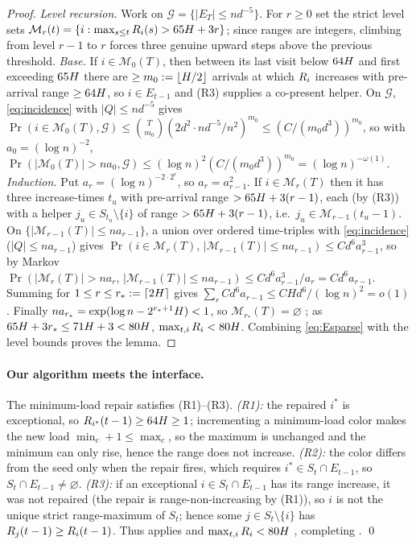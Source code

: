 \begin{proof}
\emph{Level recursion.} Work on $\mathcal G=\{|E_T|\le nd^{-5}\}$. For $r\ge0$ set the strict level sets
$\mathcal M_r(t)=\{i:\max_{s\le t}R_i(s)>65H+3r\}$; since ranges are integers, climbing from level $r-1$ to $r$
forces three genuine upward steps above the previous threshold. \emph{Base.} If $i\in\mathcal M_0(T)$, then between its last
visit below $64H$ and first exceeding $65H$ there are $\ge m_0:=\lfloor H/2\rfloor$ arrivals at which
$R_i$ increases with pre-arrival range $\ge 64H$, so $i\in E_{t-1}$ and (R3) supplies a co-present helper. On
$\mathcal G$, \eqref{eq:incidence} with $|Q|\le nd^{-5}$ gives $\Pr(i\in\mathcal M_0(T),\mathcal G)\le\binom{T}{m_0}(2d^2\cdot nd^{-5}/n^2)^{m_0}\le(C/(m_0 d^3))^{m_0}$,
so with $a_0=(\log n)^{-2}$, $\Pr(|\mathcal M_0(T)|>na_0,\mathcal G)\le(\log n)^2(C/(m_0d^3))^{m_0}=(\log n)^{-\omega(1)}$.
\emph{Induction.} Put $a_r=(\log n)^{-2\cdot2^r}$, so $a_r=a_{r-1}^2$. If $i\in\mathcal M_r(T)$ then it has three increase-times
$t_u$ with pre-arrival range $>65H+3(r-1)$, each (by (R3)) with a helper $j_u\in S_{t_u}\setminus\{i\}$ of range
$>65H+3(r-1)$, i.e.\ $j_u\in\mathcal M_{r-1}(t_u-1)$. On $\{|\mathcal M_{r-1}(T)|\le na_{r-1}\}$, a union over ordered
time-triples with \eqref{eq:incidence} ($|Q|\le na_{r-1}$) gives $\Pr(i\in\mathcal M_r(T),\,|\mathcal M_{r-1}(T)|\le na_{r-1})\le C d^6 a_{r-1}^3$,
so by Markov $\Pr(|\mathcal M_r(T)|>na_r,\,|\mathcal M_{r-1}(T)|\le na_{r-1})\le Cd^6 a_{r-1}^3/a_r=Cd^6 a_{r-1}$. Summing for
$1\le r\le r_*:=\lceil 2H\rceil$ gives $\sum_r Cd^6 a_{r-1}\le CHd^6/(\log n)^2=o(1)$. Finally
$na_{r_*}=\exp(\log n-2^{r_*+1}H)<1$, so $\mathcal M_{r_*}(T)=\varnothing$ \whp; as $65H+3r_*\le 71H+3<80H$,
$\max_{t,i}R_i<80H$. Combining \eqref{eq:Esparse} with the level bounds proves the lemma.
\end{proof}

\paragraph{Our algorithm meets the interface.}
The minimum-load repair satisfies (R1)--(R3). \emph{(R1):} the repaired $i^*$ is exceptional, so $R_{i^*}(t-1)\ge 64H\ge1$;
incrementing a minimum-load color makes the new load $\min_c+1\le\max_c$, so the maximum is unchanged and the minimum can only
rise, hence the range does not increase. \emph{(R2):} the color differs from the seed only when the repair fires, which
requires $i^*\in S_t\cap E_{t-1}$, so $S_t\cap E_{t-1}\ne\varnothing$. \emph{(R3):} if an exceptional $i\in S_t\cap E_{t-1}$
has its range increase, it was not repaired (the repair is range-non-increasing by (R1)), so $i$ is not the unique strict
range-maximum of $S_t$; hence some $j\in S_t\setminus\{i\}$ has $R_j(t-1)\ge R_i(t-1)$. Thus 
applies and $\max_{t,i}R_i<80H$ \whp, completing . \qed

